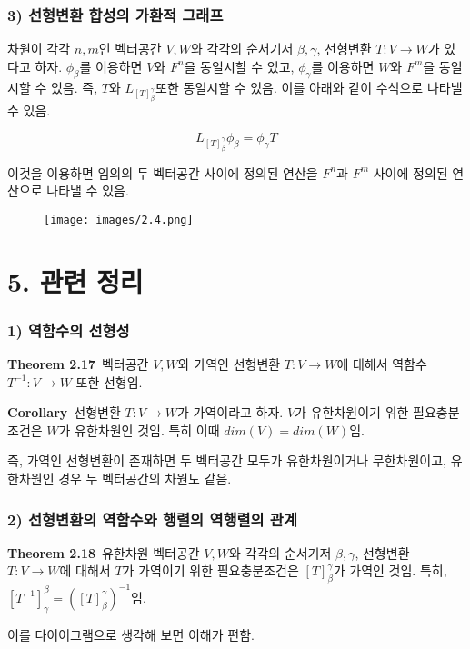 \subsubsection*{3) 선형변환 합성의 가환적 그래프}
차원이 각각 $n,m$인 벡터공간 $V,W$와 각각의 순서기저 $\beta, \gamma$, 선형변환 $T:V \rightarrow W$가 있다고 하자. $\phi_{\beta}$를 이용하면 $V$와 $F^n$을 동일시할 수 있고, $\phi_{\gamma}$를 이용하면 $W$와 $F^m$을 동일시할 수 있음. 즉, $T$와 $L_{[T]_{\beta}^{\gamma}}$또한 동일시할 수 있음. 이를 아래와 같이 수식으로 나타낼 수 있음.

\[
L_{[T]_{\beta}^{\gamma}}\phi_{\beta}=\phi_{\gamma}T
\]

이것을 이용하면 임의의 두 벡터공간 사이에 정의된 연산을 $F^n$과 $F^m$ 사이에 정의된 연산으로 나타낼 수 있음.

\begin{figure}[hbt!]
    \centering
    \texttt{[image: images/2.4.png]}\\
\end{figure}

\section*{5. 관련 정리}
\subsubsection*{1) 역함수의 선형성}
\textbf{Theorem 2.17}\, 벡터공간 $V,W$와 가역인 선형변환 $T:V \rightarrow W$에 대해서 역함수 $T^{-1}:V \rightarrow W$ 또한 선형임.

\textbf{Corollary}\, 선형변환 $T:V \rightarrow W$가 가역이라고 하자. $V$가 유한차원이기 위한 필요충분조건은 $W$가 유한차원인 것임. 특히 이때 $dim(V)=dim(W)$임.

즉, 가역인 선형변환이 존재하면 두 벡터공간 모두가 유한차원이거나 무한차원이고, 유한차원인 경우 두 벡터공간의 차원도 같음.

\subsubsection*{2) 선형변환의 역함수와 행렬의 역행렬의 관계}
\textbf{Theorem 2.18}\, 유한차원 벡터공간 $V,W$와 각각의 순서기저 $\beta,\gamma$, 선형변환 $T:V \rightarrow W$에 대해서 $T$가 가역이기 위한 필요충분조건은 $[T]^{\gamma}_{\beta}$가 가역인 것임. 특히, $[T^{-1}]_{\gamma}^{\beta}=([T]_{\beta}^{\gamma})^{-1}$임.

이를 다이어그램으로 생각해 보면 이해가 편함.

